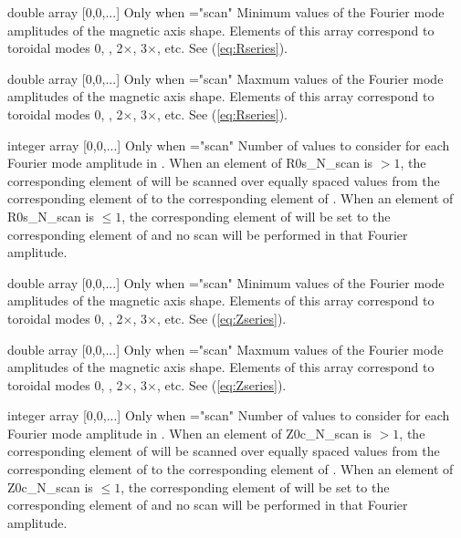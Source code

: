 {double array}
{[0,0,...]}
{Only when ={\ttfamily "scan"}}
{Minimum values of the Fourier mode amplitudes of the magnetic axis shape. Elements of this array correspond to toroidal modes 0, , 2$\times$, 3$\times$, etc.  See (\ref{eq:Rseries}).
}

\myhrule

{double array}
{[0,0,...]}
{Only when ={\ttfamily "scan"}}
{Maxmum values of the Fourier mode amplitudes of the magnetic axis shape. Elements of this array correspond to toroidal modes 0, , 2$\times$, 3$\times$, etc.  See (\ref{eq:Rseries}).
}

\myhrule

{integer array}
{[0,0,...]}
{Only when ={\ttfamily "scan"}}
{Number of values to consider for each Fourier mode amplitude in . When an element of {\ttfamily R0s\_N\_scan} is $>1$, the corresponding element of  will be scanned over equally spaced values from the corresponding element of  to the corresponding element of .  When an element of {\ttfamily R0s\_N\_scan} is $\le 1$, the corresponding element of  will be set to the corresponding element of  and no scan will be performed in that Fourier amplitude.
}

\myhrule

{double array}
{[0,0,...]}
{Only when ={\ttfamily "scan"}}
{Minimum values of the Fourier mode amplitudes of the magnetic axis shape. Elements of this array correspond to toroidal modes 0, , 2$\times$, 3$\times$, etc.  See (\ref{eq:Zseries}).
}

\myhrule

{double array}
{[0,0,...]}
{Only when ={\ttfamily "scan"}}
{Maxmum values of the Fourier mode amplitudes of the magnetic axis shape. Elements of this array correspond to toroidal modes 0, , 2$\times$, 3$\times$, etc.  See (\ref{eq:Zseries}).
}

\myhrule

{integer array}
{[0,0,...]}
{Only when ={\ttfamily "scan"}}
{Number of values to consider for each Fourier mode amplitude in . When an element of {\ttfamily Z0c\_N\_scan} is $>1$, the corresponding element of  will be scanned over equally spaced values from the corresponding element of  to the corresponding element of .  When an element of {\ttfamily Z0c\_N\_scan} is $\le 1$, the corresponding element of  will be set to the corresponding element of  and no scan will be performed in that Fourier amplitude.
}

